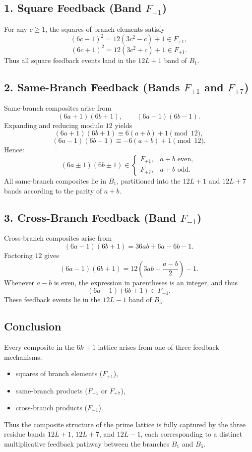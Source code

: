 \documentclass[12pt]{article}
\begin{document}
\subsection*{1. Square Feedback (Band $F_{+1}$)}
For any $c\ge 1$, the squares of branch elements satisfy
\[
(6c-1)^2 = 12(3c^2 - c) + 1 \in F_{+1},
\]
\[
(6c+1)^2 = 12(3c^2 + c) + 1 \in F_{+1}.
\]
Thus all square feedback events land in the $12L+1$ band of $B_1$.

\subsection*{2. Same-Branch Feedback (Bands $F_{+1}$ and $F_{+7}$)}
Same-branch composites arise from
\[
(6a+1)(6b+1), \qquad (6a-1)(6b-1).
\]
Expanding and reducing modulo $12$ yields
\[
(6a+1)(6b+1) \equiv 6(a+b) + 1 \pmod{12},
\]
\[
(6a-1)(6b-1) \equiv -6(a+b) + 1 \pmod{12}.
\]
Hence:
\[
(6a\pm1)(6b\pm1) \in
\begin{cases}
F_{+1}, & a+b \text{ even}, \\[4pt]
F_{+7}, & a+b \text{ odd}.
\end{cases}
\]
All same-branch composites lie in $B_1$, partitioned into the $12L+1$ and
$12L+7$ bands according to the parity of $a+b$.

\subsection*{3. Cross-Branch Feedback (Band $F_{-1}$)}
Cross-branch composites arise from
\[
(6a-1)(6b+1) = 36ab + 6a - 6b - 1.
\]
Factoring $12$ gives
\[
(6a-1)(6b+1)
= 12\left(3ab + \frac{a-b}{2}\right) - 1.
\]
Whenever $a-b$ is even, the expression in parentheses is an integer, and thus
\[
(6a-1)(6b+1) \in F_{-1}.
\]
These feedback events lie in the $12L-1$ band of $B_5$.

\subsection*{Conclusion}
Every composite in the $6k\pm1$ lattice arises from one of three feedback
mechanisms:
\begin{itemize}
\item squares of branch elements ($F_{+1}$),
\item same-branch products ($F_{+1}$ or $F_{+7}$),
\item cross-branch products ($F_{-1}$).
\end{itemize}
Thus the composite structure of the prime lattice is fully captured by the
three residue bands $12L+1$, $12L+7$, and $12L-1$, each corresponding to a
distinct multiplicative feedback pathway between the branches $B_1$ and $B_5$.
\end{document}
